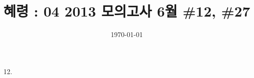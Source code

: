\documentclass{article}
\title{혜령 : 04 2013 모의고사 6월 \#12, \#27}
\date{\today}
\author{}
\begin{document}
\maketitle

12.
\end{document}
